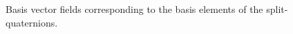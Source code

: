 % 
% 
\begin{figure}[ht!]
    \centering
    
    \caption{Basis vector fields corresponding to the basis elements of the split-quaternions.}
    \label{fig:basis_vf}
\end{figure}
% 
